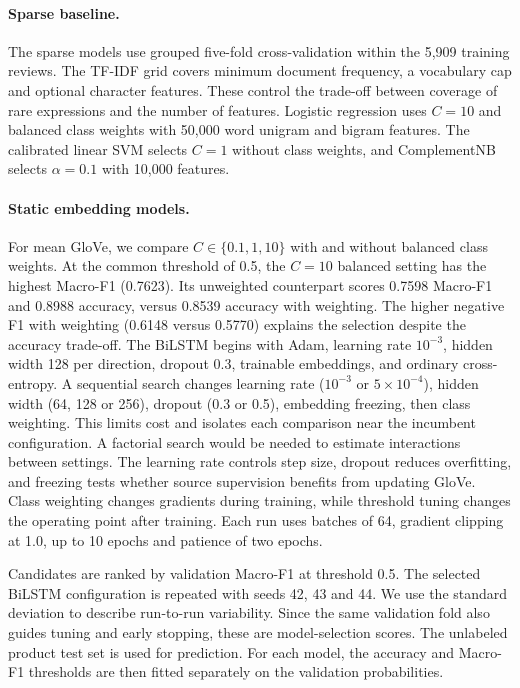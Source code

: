 \paragraph{Sparse baseline.}
The sparse models use grouped five-fold cross-validation within the 5,909
training reviews. The TF-IDF grid covers minimum document frequency, a
vocabulary cap and optional character features. These control the trade-off
between coverage of rare expressions and the number of features. Logistic
regression uses $C=10$ and balanced class weights with 50,000 word unigram and
bigram features. The calibrated linear SVM selects $C=1$ without class weights,
and ComplementNB selects $\alpha=0.1$ with 10,000 features.

\paragraph{Static embedding models.}
For mean GloVe, we compare $C\in\{0.1,1,10\}$ with and without balanced class
weights. At the common threshold of 0.5, the $C=10$ balanced setting has the
highest Macro-F1 (0.7623). Its unweighted counterpart scores 0.7598 Macro-F1
and 0.8988 accuracy, versus 0.8539 accuracy with weighting. The higher negative
F1 with weighting (0.6148 versus 0.5770) explains the selection despite the
accuracy trade-off. The BiLSTM begins with Adam, learning rate $10^{-3}$, hidden width 128
per direction, dropout 0.3, trainable embeddings, and ordinary cross-entropy.
A sequential search changes learning rate ($10^{-3}$ or $5\times10^{-4}$),
hidden width (64, 128 or 256), dropout (0.3 or 0.5), embedding freezing, then
class weighting. This limits cost and isolates each comparison near the
incumbent configuration. A factorial search would be needed to estimate
interactions between settings.
The learning rate controls step size, dropout reduces overfitting, and
freezing tests whether source supervision benefits from updating GloVe.
Class weighting changes gradients during training, while threshold tuning
changes the operating point after training. Each run uses batches of 64,
gradient clipping at 1.0, up to 10 epochs and patience of two epochs.

Candidates are ranked by validation Macro-F1 at threshold 0.5. The selected
BiLSTM configuration is repeated with seeds 42, 43 and 44. We use the
standard deviation to describe run-to-run variability. Since the same
validation fold also guides tuning and early stopping, these are model-selection
scores. The unlabeled product test set is used for prediction.
For each model, the accuracy and Macro-F1 thresholds are then fitted separately
on the validation probabilities.

